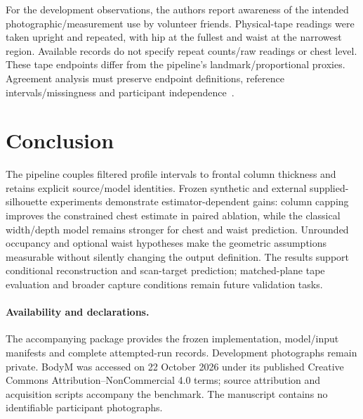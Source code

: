 \documentclass[11pt,a4paper]{article}
\begin{document}
For the development observations, the authors report awareness of the intended photographic/measurement use by volunteer friends. Physical-tape readings were taken upright and repeated, with hip at the fullest and waist at the narrowest region. Available records do not specify repeat counts/raw readings or chest level. These tape endpoints differ from the pipeline's landmark/proportional proxies. Agreement analysis must preserve endpoint definitions, reference intervals/missingness and participant independence~\cite{bland1986}.

\section{Conclusion}
The pipeline couples filtered profile intervals to frontal column thickness and retains explicit source/model identities. Frozen synthetic and external supplied-silhouette experiments demonstrate estimator-dependent gains: column capping improves the constrained chest estimate in paired ablation, while the classical width/depth model remains stronger for chest and waist prediction. Unrounded occupancy and optional waist hypotheses make the geometric assumptions measurable without silently changing the output definition. The results support conditional reconstruction and scan-target prediction; matched-plane tape evaluation and broader capture conditions remain future validation tasks.

\paragraph{Availability and declarations.}
The accompanying package provides the frozen implementation, model/input manifests and complete attempted-run records. Development photographs remain private. BodyM was accessed on 22 October 2026 under its published Creative Commons Attribution--NonCommercial 4.0 terms; source attribution and acquisition scripts accompany the benchmark. The manuscript contains no identifiable participant photographs.
\end{document}
